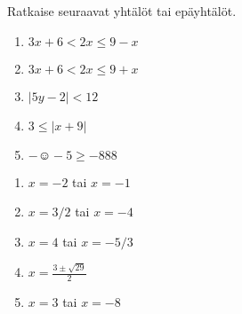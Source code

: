 \begin{tehtava}
    Ratkaise seuraavat yhtälöt tai epäyhtälöt.
    \begin{enumerate}
        \item $3x+6<2x\leq 9-x$
        \item $3x+6<2x\leq 9+x$
        \item $|5y-2|<12$
        \item $3\leq |x+9|$
        \item $-\smiley{}-5\geq-888$
    \end{enumerate}
    \begin{vastaus}
        \begin{enumerate}
            \item $x=-2$ tai $x=-1$
            \item $x=3/2$ tai $x=-4$
            \item $x=4$ tai $x=-5/3$
            \item $x=\frac{3\pm\sqrt{29}}{2}$
            \item $x=3$ tai $x=-8$
        \end{enumerate}
    \end{vastaus}
\end{tehtava}